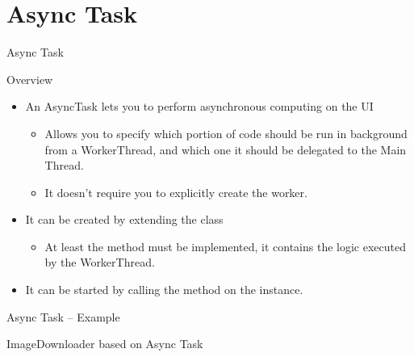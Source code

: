 \documentclass{beamer}
\begin{document}
\section{Async Task}

  \begin{frame}{Async Task}
    \begin{block}{Overview}
      \begin{itemize}
        \item An AsyncTask lets you to perform asynchronous computing on the UI
        \begin{itemize}
          \item Allows you to specify which portion of code should be run in
          background from a WorkerThread, and which one it should be delegated to
          the Main Thread.
          \item It doesn't require you to explicitly create the worker.
        \end{itemize}{\vspace{10pt}}
        \item It can be created by extending the  class
        \begin{itemize}
          \item At least the  method must be implemented,
          it contains the logic executed by the WorkerThread.
        \end{itemize}{\vspace{10pt}}
        \item It can be started by calling the  method on the
        instance.
      \end{itemize}
    \end{block}
  \end{frame}

  \begin{frame}[fragile]{Async Task -- Example}
    \begin{exampleblock}{ImageDownloader based on Async Task}
      
    \end{exampleblock}
  \end{frame}
\end{document}
